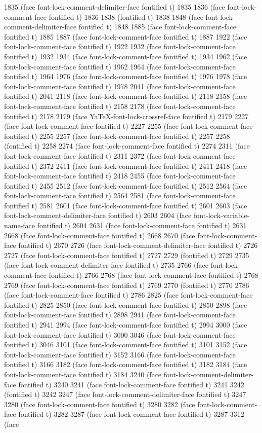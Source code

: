 {1835 (face font-lock-comment-delimiter-face fontified t) 1835 1836 (face font-lock-comment-face fontified t) 1836 1838 (fontified t) 1838 1848 (face font-lock-comment-delimiter-face fontified t) 1848 1885 (face font-lock-comment-face fontified t) 1885 1887 (face font-lock-comment-face fontified t) 1887 1922 (face font-lock-comment-face fontified t) 1922 1932 (face font-lock-comment-face fontified t) 1932 1934 (face font-lock-comment-face fontified t) 1934 1962 (face font-lock-comment-face fontified t) 1962 1964 (face font-lock-comment-face fontified t) 1964 1976 (face font-lock-comment-face fontified t) 1976 1978 (face font-lock-comment-face fontified t) 1978 2041 (face font-lock-comment-face fontified t) 2041 2118 (face font-lock-comment-face fontified t) 2118 2158 (face font-lock-comment-face fontified t) 2158 2178 (face font-lock-comment-face fontified t) 2178 2179 (face YaTeX-font-lock-crossref-face fontified t) 2179 2227 (face font-lock-comment-face fontified t) 2227 2255 (face font-lock-comment-face fontified t) 2255 2257 (face font-lock-comment-face fontified t) 2257 2258 (fontified t) 2258 2274 (face font-lock-comment-face fontified t) 2274 2311 (face font-lock-comment-face fontified t) 2311 2372 (face font-lock-comment-face fontified t) 2372 2411 (face font-lock-comment-face fontified t) 2411 2418 (face font-lock-comment-face fontified t) 2418 2455 (face font-lock-comment-face fontified t) 2455 2512 (face font-lock-comment-face fontified t) 2512 2564 (face font-lock-comment-face fontified t) 2564 2581 (face font-lock-comment-face fontified t) 2581 2601 (face font-lock-comment-face fontified t) 2601 2603 (face font-lock-comment-delimiter-face fontified t) 2603 2604 (face font-lock-variable-name-face fontified t) 2604 2631 (face font-lock-comment-face fontified t) 2631 2668 (face font-lock-comment-face fontified t) 2668 2670 (face font-lock-comment-face fontified t) 2670 2726 (face font-lock-comment-delimiter-face fontified t) 2726 2727 (face font-lock-comment-face fontified t) 2727 2729 (fontified t) 2729 2735 (face font-lock-comment-delimiter-face fontified t) 2735 2766 (face font-lock-comment-face fontified t) 2766 2768 (face font-lock-comment-face fontified t) 2768 2769 (face font-lock-comment-face fontified t) 2769 2770 (fontified t) 2770 2786 (face font-lock-comment-face fontified t) 2786 2825 (face font-lock-comment-face fontified t) 2825 2850 (face font-lock-comment-face fontified t) 2850 2898 (face font-lock-comment-face fontified t) 2898 2941 (face font-lock-comment-face fontified t) 2941 2994 (face font-lock-comment-face fontified t) 2994 3000 (face font-lock-comment-face fontified t) 3000 3046 (face font-lock-comment-face fontified t) 3046 3101 (face font-lock-comment-face fontified t) 3101 3152 (face font-lock-comment-face fontified t) 3152 3166 (face font-lock-comment-face fontified t) 3166 3182 (face font-lock-comment-face fontified t) 3182 3184 (face font-lock-comment-face fontified t) 3184 3240 (face font-lock-comment-delimiter-face fontified t) 3240 3241 (face font-lock-comment-face fontified t) 3241 3242 (fontified t) 3242 3247 (face font-lock-comment-delimiter-face fontified t) 3247 3280 (face font-lock-comment-face fontified t) 3280 3282 (face font-lock-comment-face fontified t) 3282 3287 (face font-lock-comment-face fontified t) 3287 3312 (face }
